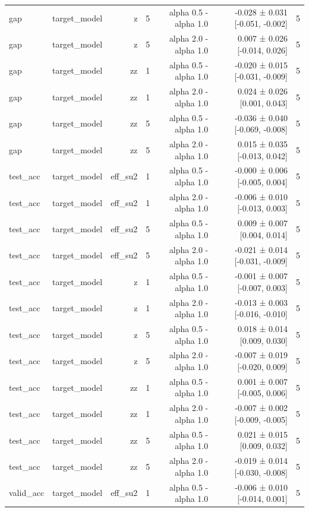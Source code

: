 \begin{table}
\begin{tabular}{lrrrrrr}
gap & target\_model & z & 5 & alpha 0.5 - alpha 1.0 & -0.028 ± 0.031 [-0.051, -0.002] & 5 \\
gap & target\_model & z & 5 & alpha 2.0 - alpha 1.0 & 0.007 ± 0.026 [-0.014, 0.026] & 5 \\
gap & target\_model & zz & 1 & alpha 0.5 - alpha 1.0 & -0.020 ± 0.015 [-0.031, -0.009] & 5 \\
gap & target\_model & zz & 1 & alpha 2.0 - alpha 1.0 & 0.024 ± 0.026 [0.001, 0.043] & 5 \\
gap & target\_model & zz & 5 & alpha 0.5 - alpha 1.0 & -0.036 ± 0.040 [-0.069, -0.008] & 5 \\
gap & target\_model & zz & 5 & alpha 2.0 - alpha 1.0 & 0.015 ± 0.035 [-0.013, 0.042] & 5 \\
test\_acc & target\_model & eff\_su2 & 1 & alpha 0.5 - alpha 1.0 & -0.000 ± 0.006 [-0.005, 0.004] & 5 \\
test\_acc & target\_model & eff\_su2 & 1 & alpha 2.0 - alpha 1.0 & -0.006 ± 0.010 [-0.013, 0.003] & 5 \\
test\_acc & target\_model & eff\_su2 & 5 & alpha 0.5 - alpha 1.0 & 0.009 ± 0.007 [0.004, 0.014] & 5 \\
test\_acc & target\_model & eff\_su2 & 5 & alpha 2.0 - alpha 1.0 & -0.021 ± 0.014 [-0.031, -0.009] & 5 \\
test\_acc & target\_model & z & 1 & alpha 0.5 - alpha 1.0 & -0.001 ± 0.007 [-0.007, 0.003] & 5 \\
test\_acc & target\_model & z & 1 & alpha 2.0 - alpha 1.0 & -0.013 ± 0.003 [-0.016, -0.010] & 5 \\
test\_acc & target\_model & z & 5 & alpha 0.5 - alpha 1.0 & 0.018 ± 0.014 [0.009, 0.030] & 5 \\
test\_acc & target\_model & z & 5 & alpha 2.0 - alpha 1.0 & -0.007 ± 0.019 [-0.020, 0.009] & 5 \\
test\_acc & target\_model & zz & 1 & alpha 0.5 - alpha 1.0 & 0.001 ± 0.007 [-0.005, 0.006] & 5 \\
test\_acc & target\_model & zz & 1 & alpha 2.0 - alpha 1.0 & -0.007 ± 0.002 [-0.009, -0.005] & 5 \\
test\_acc & target\_model & zz & 5 & alpha 0.5 - alpha 1.0 & 0.021 ± 0.015 [0.009, 0.032] & 5 \\
test\_acc & target\_model & zz & 5 & alpha 2.0 - alpha 1.0 & -0.019 ± 0.014 [-0.030, -0.008] & 5 \\
valid\_acc & target\_model & eff\_su2 & 1 & alpha 0.5 - alpha 1.0 & -0.006 ± 0.010 [-0.014, 0.001] & 5 \\

\end{tabular}
\end{table}

